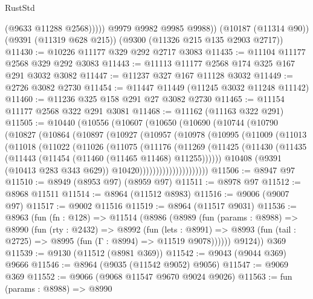 \begin{lexlean}{RustStd}
\begin{coremodule}
                (@9633 @11288 @2568)))))
        @9979
        @9982
        @9985
        @9988))
    (@10187 (@11314 @90))
    (@9391 (@11319 @628 @215))
    (@9300 (@11326 @215 @135 @2903 @2717))
@11430 := @10226 @11177 @329 @292 @2717 @3083
@11435 := @11104 @11177 @2568 @329 @292 @3083
@11443 := @11113 @11177 @2568 @174 @325 @167 @291 @3032 @3082
@11447 := @11237 @327 @167 @11128 @3032
@11449 := @2726 @3082 @2730
@11454 := @11447 @11449 (@11245 @3032 @11248 @11142)
@11460 := @11236 @325 @158 @291 @27 @3082 @2730
@11465 := @11154 @11177 @2568 @322 @291 @3081
@11468 := @11162 (@11163 @322 @291)
@11505 := @10440
    (@10556
      (@10607
        (@10650
          (@10690
            (@10744
              (@10790
                (@10827
                  (@10864
                    (@10897
                      (@10927
                        (@10957
                          (@10978
                            (@10995
                              (@11009
                                (@11013
                                  (@11018
                                    (@11022
                                      (@11026
                                        (@11075
                                          (@11176
                                            (@11269
                                              (@11425
                                                (@11430
                                                  (@11435
                                                    (@11443
                                                      (@11454 (@11460 (@11465 @11468) @11255))))))
                                              @10408
                                              (@9391 (@10413 @283 @343 @629))
                                              @10420)))))))))))))))))))))
@11506 := @8947 @97
@11510 := @8949 (@8953 @97) (@8959 @97)
@11511 := @8978 @97
@11512 := @8968 @11511
@11514 := @8964 (@11512 @8983)
@11516 := @9006 (@9007 @97)
@11517 := @9002 @11516
@11519 := @8964 (@11517 @9031)
@11536 := @8963
    (fun (fn : @128) =>
    @11514
      (@8986
        (@8989
          (fun (params : @8988) =>
          @8990
            (fun (rty : @2432) =>
            @8992
              (fun (lets : @8991) =>
              @8993 (fun (tail : @2725) => @8995 (fun (Γ : @8994) => @11519 @9078))))))
        @9124))
    @369
@11539 := @9130 (@11512 (@8981 @369))
@11542 := @9043 (@9044 @369) @9666
@11546 := @8964 (@9035 (@11542 @9052) @9056)
@11547 := @9069 @369
@11552 := @9066 (@9068 @11547 @9670 @9024 @9026)
@11563 := fun (params : @8988) =>
  @8990

\end{coremodule}
\end{lexlean}
